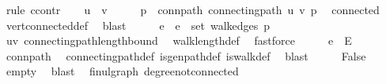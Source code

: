 \begin{isabellebody}
%
\isadelimproof
%
\endisadelimproof
%
\isatagproof
{}\isamarkupfalse%
\ {\isacharparenleft}{\kern0pt}rule\ ccontr{\isacharparenright}{\kern0pt}\isanewline
\ \ \isamarkupfalse%
\ {\isachardoublequoteopen}u\ {\isasymnoteq}\ v{\isachardoublequoteclose}\isanewline
\ \ \isamarkupfalse%
\ \isamarkupfalse%
\ p\ \ conn{\isacharunderscore}{\kern0pt}path{\isacharcolon}{\kern0pt}\ {\isachardoublequoteopen}connecting{\isacharunderscore}{\kern0pt}path\ u\ v\ p{\isachardoublequoteclose}\ \isamarkupfalse%
\ connected\ \isamarkupfalse%
\ vert{\isacharunderscore}{\kern0pt}connected{\isacharunderscore}{\kern0pt}def\ \isamarkupfalse%
\ blast\isanewline
\ \ \isamarkupfalse%
\ \isamarkupfalse%
\ e\ \ {\isachardoublequoteopen}e\ {\isasymin}\ set\ {\isacharparenleft}{\kern0pt}walk{\isacharunderscore}{\kern0pt}edges\ p{\isacharparenright}{\kern0pt}{\isachardoublequoteclose}\ \isamarkupfalse%
\ {\isacartoucheopen}u{\isasymnoteq}v{\isacartoucheclose}\ connecting{\isacharunderscore}{\kern0pt}path{\isacharunderscore}{\kern0pt}length{\isacharunderscore}{\kern0pt}bound\ \isamarkupfalse%
\ walk{\isacharunderscore}{\kern0pt}length{\isacharunderscore}{\kern0pt}def\ \isamarkupfalse%
\ fastforce\isanewline
\ \ \isamarkupfalse%
\ \isamarkupfalse%
\ {\isachardoublequoteopen}e\ {\isasymin}\ E{\isachardoublequoteclose}\ \isamarkupfalse%
\ conn{\isacharunderscore}{\kern0pt}path\ \isamarkupfalse%
\ connecting{\isacharunderscore}{\kern0pt}path{\isacharunderscore}{\kern0pt}def\ is{\isacharunderscore}{\kern0pt}gen{\isacharunderscore}{\kern0pt}path{\isacharunderscore}{\kern0pt}def\ is{\isacharunderscore}{\kern0pt}walk{\isacharunderscore}{\kern0pt}def\ \isamarkupfalse%
\ blast\isanewline
\ \ \isamarkupfalse%
\ \isamarkupfalse%
\ False\ \isamarkupfalse%
\ empty\ \isamarkupfalse%
\ blast\isanewline
{}\isamarkupfalse%
%
\endisatagproof
{\isafoldproof}%
%
\isadelimproof
\isanewline
%
\endisadelimproof
\isanewline
{}\isamarkupfalse%
\ {\isacharparenleft}{\kern0pt}\ fin{\isacharunderscore}{\kern0pt}ulgraph{\isacharparenright}{\kern0pt}\ degree{\isacharunderscore}{\kern0pt}{}{\isacharunderscore}{\kern0pt}not{\isacharunderscore}{\kern0pt}connected{\isacharcolon}{\kern0pt}\isanewline

\end{isabellebody}
